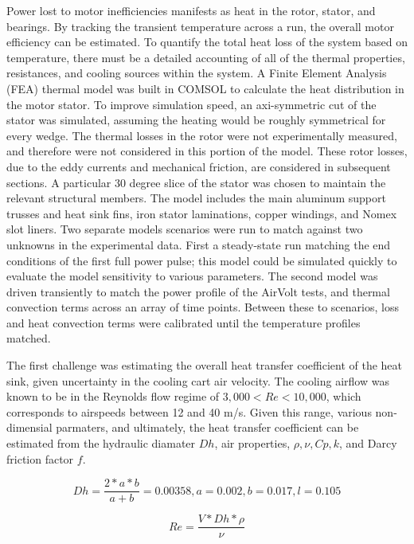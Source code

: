 \documentclass[]{aiaa-tc}%
\begin{document}
Power lost to motor inefficiencies manifests as heat in the rotor, stator, and bearings. By tracking the transient temperature across a run, the overall motor efficiency can be estimated. To quantify the total heat loss of the system based on temperature, there must be a detailed accounting of all of the thermal properties, resistances, and cooling sources within the system. A Finite Element Analysis (FEA) thermal model was built in COMSOL to calculate the heat distribution in the motor stator. To improve simulation speed, an axi-symmetric cut of the stator was simulated, assuming the heating would be roughly symmetrical for every wedge. The thermal losses in the rotor were not experimentally measured, and therefore were not considered in this portion of the model. These rotor losses, due to the eddy currents and mechanical friction, are considered in subsequent sections. A particular 30 degree slice of the stator was chosen to maintain the relevant structural members. The model includes the main aluminum support trusses and heat sink fins, iron stator laminations, copper windings, and Nomex slot liners. Two separate models scenarios were run to match against two unknowns in the experimental data. First a steady-state run matching the end conditions of the first full power pulse; this model could be simulated quickly to evaluate the model sensitivity to various parameters. The second model was driven transiently to match the power profile of the AirVolt tests, and thermal convection terms across an array of time points. Between these to scenarios, loss and heat convection terms were calibrated until the temperature profiles matched.

The first challenge was estimating the overall heat transfer coefficient of the heat sink, given uncertainty in the cooling cart air velocity. The cooling airflow was known to be in the Reynolds flow regime of $3,000<Re<10,000$, which corresponds to airspeeds between 12 and 40 m/s. Given this range, various non-dimensial parmaters, and ultimately, the heat transfer coefficient can be estimated from the hydraulic diamater $Dh$, air properties, $\rho, \nu, Cp, k$, and Darcy friction factor $f$.

\begin{equation}
Dh = \frac{2*a*b}{a+b} = 0.00358,
a = 0.002, b = 0.017, l = 0.105
\label{eq:Dh}
\end{equation}

\begin{equation}
Re = \frac{V*Dh*\rho}{\nu}
\label{eq:Re}
\end{equation}
\end{document}
